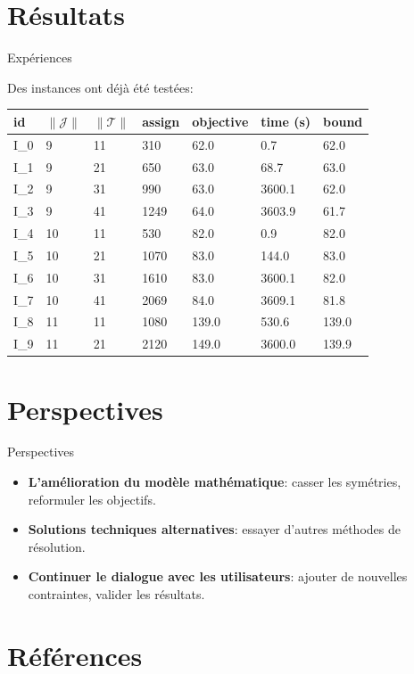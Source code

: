 \documentclass[ignorenonframetext,]{beamer}
\providecommand{\tightlist}{%
  \setlength{\itemsep}{0pt}\setlength{\parskip}{0pt}}
\begin{document}
\section{Résultats}\label{resultats}

\begin{frame}{Expériences}

Des instances ont déjà été testées:

\begin{longtable}[]{@{}lllllll@{}}
\toprule
id & \(\|\mathcal{J}\|\) & \(\|\mathcal{T}\|\) & assign & objective &
time (s) & bound\tabularnewline
\midrule
\endhead
I\_0 & 9 & 11 & 310 & 62.0 & 0.7 & 62.0\tabularnewline
I\_1 & 9 & 21 & 650 & 63.0 & 68.7 & 63.0\tabularnewline
I\_2 & 9 & 31 & 990 & 63.0 & 3600.1 & 62.0\tabularnewline
I\_3 & 9 & 41 & 1249 & 64.0 & 3603.9 & 61.7\tabularnewline
I\_4 & 10 & 11 & 530 & 82.0 & 0.9 & 82.0\tabularnewline
I\_5 & 10 & 21 & 1070 & 83.0 & 144.0 & 83.0\tabularnewline
I\_6 & 10 & 31 & 1610 & 83.0 & 3600.1 & 82.0\tabularnewline
I\_7 & 10 & 41 & 2069 & 84.0 & 3609.1 & 81.8\tabularnewline
I\_8 & 11 & 11 & 1080 & 139.0 & 530.6 & 139.0\tabularnewline
I\_9 & 11 & 21 & 2120 & 149.0 & 3600.0 & 139.9\tabularnewline
\bottomrule
\end{longtable}

\end{frame}

\section{Perspectives}\label{perspectives}

\begin{frame}{Perspectives}

\begin{itemize}[<+->]
\tightlist
\item
  \textbf{L'amélioration du modèle mathématique}: casser les symétries,
  reformuler les objectifs.
\item
  \textbf{Solutions techniques alternatives}: essayer d'autres méthodes
  de résolution.
\item
  \textbf{Continuer le dialogue avec les utilisateurs}: ajouter de
  nouvelles contraintes, valider les résultats.
\end{itemize}

\end{frame}

\section{Références}\label{references}
\end{document}
